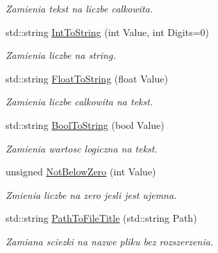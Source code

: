 \begin{DoxyCompactItemize}
\begin{DoxyCompactList}\small\item\em Zamienia tekst na liczbe calkowita. \end{DoxyCompactList}\item 
\mbox{\label{namespacetfp_a5da5969f0f2e019962f1f834fbcfa83b}} 
std\+::string \mbox{\hyperlink{namespacetfp_a5da5969f0f2e019962f1f834fbcfa83b}{Int\+To\+String}} (int Value, int Digits=0)
\begin{DoxyCompactList}\small\item\em Zamienia liczbe na string. \end{DoxyCompactList}\item 
\mbox{\label{namespacetfp_a1ceb3266b9bcd9486adbfae817185b7d}} 
std\+::string \mbox{\hyperlink{namespacetfp_a1ceb3266b9bcd9486adbfae817185b7d}{Float\+To\+String}} (float Value)
\begin{DoxyCompactList}\small\item\em Zamienia liczbe calkowita na tekst. \end{DoxyCompactList}\item 
\mbox{\label{namespacetfp_ae10c558c42e3f48c1fe23ad91ead0ff0}} 
std\+::string \mbox{\hyperlink{namespacetfp_ae10c558c42e3f48c1fe23ad91ead0ff0}{Bool\+To\+String}} (bool Value)
\begin{DoxyCompactList}\small\item\em Zamienia wartosc logiczna na tekst. \end{DoxyCompactList}\item 
\mbox{\label{namespacetfp_a54df9fae9794eaf9123b325e3702d1f3}} 
unsigned \mbox{\hyperlink{namespacetfp_a54df9fae9794eaf9123b325e3702d1f3}{Not\+Below\+Zero}} (int Value)
\begin{DoxyCompactList}\small\item\em Zmienia liczbe na zero jesli jest ujemna. \end{DoxyCompactList}\item 
\mbox{\label{namespacetfp_af7c8e06f5300a8910e06bed36b41204d}} 
std\+::string \mbox{\hyperlink{namespacetfp_af7c8e06f5300a8910e06bed36b41204d}{Path\+To\+File\+Title}} (std\+::string Path)
\begin{DoxyCompactList}\small\item\em Zamiana sciezki na nazwe pliku bez rozszerzenia. \end{DoxyCompactList}\item 

\end{DoxyCompactItemize}
